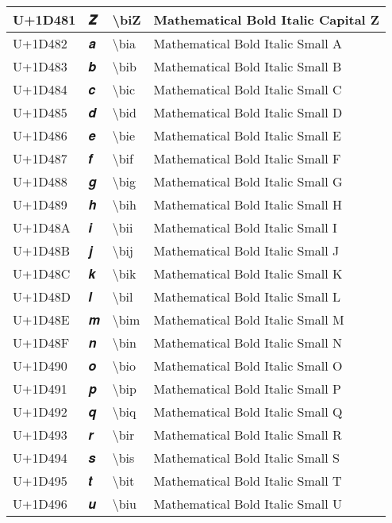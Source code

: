 \begin{table}[h]
\begin{tabulary}{\linewidth}{|L|L|L|L|}
\hline
U+1D481 & 𝒁 & {\textbackslash}biZ & Mathematical Bold Italic Capital Z \\
\hline
U+1D482 & 𝒂 & {\textbackslash}bia & Mathematical Bold Italic Small A \\
\hline
U+1D483 & 𝒃 & {\textbackslash}bib & Mathematical Bold Italic Small B \\
\hline
U+1D484 & 𝒄 & {\textbackslash}bic & Mathematical Bold Italic Small C \\
\hline
U+1D485 & 𝒅 & {\textbackslash}bid & Mathematical Bold Italic Small D \\
\hline
U+1D486 & 𝒆 & {\textbackslash}bie & Mathematical Bold Italic Small E \\
\hline
U+1D487 & 𝒇 & {\textbackslash}bif & Mathematical Bold Italic Small F \\
\hline
U+1D488 & 𝒈 & {\textbackslash}big & Mathematical Bold Italic Small G \\
\hline
U+1D489 & 𝒉 & {\textbackslash}bih & Mathematical Bold Italic Small H \\
\hline
U+1D48A & 𝒊 & {\textbackslash}bii & Mathematical Bold Italic Small I \\
\hline
U+1D48B & 𝒋 & {\textbackslash}bij & Mathematical Bold Italic Small J \\
\hline
U+1D48C & 𝒌 & {\textbackslash}bik & Mathematical Bold Italic Small K \\
\hline
U+1D48D & 𝒍 & {\textbackslash}bil & Mathematical Bold Italic Small L \\
\hline
U+1D48E & 𝒎 & {\textbackslash}bim & Mathematical Bold Italic Small M \\
\hline
U+1D48F & 𝒏 & {\textbackslash}bin & Mathematical Bold Italic Small N \\
\hline
U+1D490 & 𝒐 & {\textbackslash}bio & Mathematical Bold Italic Small O \\
\hline
U+1D491 & 𝒑 & {\textbackslash}bip & Mathematical Bold Italic Small P \\
\hline
U+1D492 & 𝒒 & {\textbackslash}biq & Mathematical Bold Italic Small Q \\
\hline
U+1D493 & 𝒓 & {\textbackslash}bir & Mathematical Bold Italic Small R \\
\hline
U+1D494 & 𝒔 & {\textbackslash}bis & Mathematical Bold Italic Small S \\
\hline
U+1D495 & 𝒕 & {\textbackslash}bit & Mathematical Bold Italic Small T \\
\hline
U+1D496 & 𝒖 & {\textbackslash}biu & Mathematical Bold Italic Small U \\

\end{tabulary}
\end{table}
